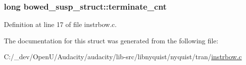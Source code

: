 \subsubsection[{\texorpdfstring{terminate\+\_\+cnt}{terminate_cnt}}]{\setlength{\rightskip}{0pt plus 5cm}long bowed\+\_\+susp\+\_\+struct\+::terminate\+\_\+cnt}\hypertarget{structbowed__susp__struct_a8ab8386ebc09edefd6bde416f1fe7355}{}\label{structbowed__susp__struct_a8ab8386ebc09edefd6bde416f1fe7355}


Definition at line 17 of file instrbow.\+c.



The documentation for this struct was generated from the following file\+:\begin{DoxyCompactItemize}
\item 
C\+:/\+\_\+dev/\+Open\+U/\+Audacity/audacity/lib-\/src/libnyquist/nyquist/tran/\hyperlink{instrbow_8c}{instrbow.\+c}\end{DoxyCompactItemize}
